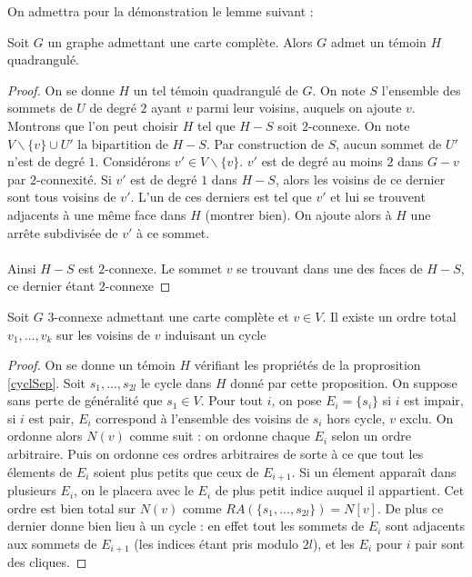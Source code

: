 \documentclass{scrartcl}
\begin{document}
\begin{flushleft}
On admettra pour la démonstration le lemme suivant :
\begin{lem}
    Soit $G$ un graphe admettant une carte complète. Alors $G$ admet un témoin $H$ quadrangulé.
\end{lem}

\begin{proof}
    On se donne $H$ un tel témoin quadrangulé de $G$. On note $S$ l'ensemble des sommets de $U$ de degré $2$ ayant $v$ parmi leur voisins, auquels on
    ajoute $v$. Montrons que l'on peut choisir $H$ tel que $H - S$ soit $2$-connexe. On note $V \backslash \{v\} \cup U'$ la bipartition de $H-S$.
    Par construction de $S$, aucun sommet de $U'$ n'est de degré $1$. Considérons $v' \in V \backslash \{v\}$. $v'$ est de degré au moins $2$
    dans $G-v$ par $2$-connexité. Si $v'$ est de degré $1$ dans $H-S$, alors les voisins de ce dernier sont tous voisins de $v'$.
    L'un de ces derniers est tel que $v'$ et lui se trouvent adjacents à une même face dans $H$ (montrer bien).
    On ajoute alors à $H$ une arrête subdivisée de $v'$ à ce sommet.
    \\~\\
    Ainsi $H-S$ est $2$-connexe. Le sommet $v$ se trouvant dans une des faces de $H - S$, ce dernier étant $2$-connexe 
\end{proof}

\begin{cor}\label{ordCycl}
    Soit $G$ $3$-connexe admettant une carte complète et $v \in V$. Il existe un ordre total $v_1, ..., v_k$ sur les voisins de $v$
    induisant un cycle
\end{cor}

\begin{proof}
    On se donne un témoin $H$ vérifiant les propriétés de la proprosition \ref{cyclSep}. Soit $s_1, ..., s_{2l}$ le cycle dans $H$
    donné par cette proposition. On suppose sans perte de généralité que $s_1 \in V$. Pour tout $i$, on pose $E_i = \{s_i\}$
    si $i$ est impair, si $i$ est pair, $E_i$ correspond à l'ensemble des voisins de $s_i$ hors cycle, $v$ exclu. On ordonne alors $N(v)$
    comme suit : on ordonne chaque $E_i$ selon un ordre arbitraire. Puis on ordonne ces ordres arbitraires de sorte à ce que
    tout les élements de $E_i$ soient plus petits que ceux de $E_{i+1}$. Si un élement apparaît dans plusieurs $E_i$, on le placera avec
    le $E_i$ de plus petit indice auquel il appartient. Cet ordre est bien total sur $N(v)$
    comme $RA(\{s_1, ..., s_{2l}\}) = N[v]$. De plus ce dernier donne bien lieu à un cycle : en effet tout les sommets de $E_i$ sont
    adjacents aux sommets de $E_{i+1}$ (les indices étant pris modulo $2l$), et les $E_i$ pour $i$ pair sont des cliques.
\end{proof}


\end{flushleft}
\end{document}

